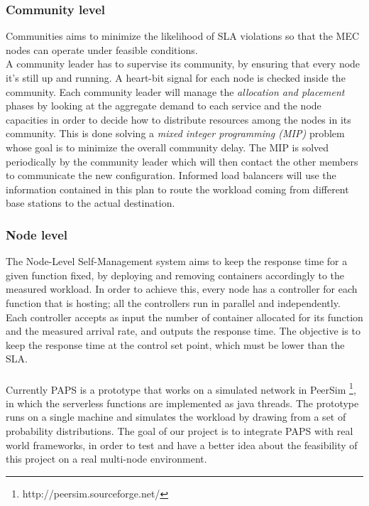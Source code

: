\begin{figure}[h]
    \centering
    \label{fig:pseudocode}
    \label{fig:communities}
\end{figure}

\subsubsection*{Community level}
Communities aims to minimize the likelihood of SLA violations so that the MEC nodes
can operate under feasible conditions.\\
A community leader has to supervise its community, by ensuring that every node it's still up and running.
A heart-bit signal for each node is checked inside the community.
Each community leader will manage the \textit{allocation and placement} phases by looking at 
the aggregate demand to each service and the node capacities in order to decide how to 
distribute resources among the nodes in its community. This is done solving a \textit{mixed
integer programming (MIP)} problem whose goal is to minimize the overall community delay. 
The MIP is solved periodically by the community leader which will then contact the other members
to communicate the new configuration.
Informed load balancers will use the information contained in this plan to route the workload 
coming from different base stations to the actual destination.

\subsubsection*{Node level}
The Node-Level Self-Management system aims to keep the response time for a given function fixed, 
by deploying and removing containers accordingly to the measured workload.
In order to achieve this, every node has a controller for each function that is hosting; all the controllers
run in parallel and independently.
Each controller accepts as input the number of container allocated for its function and the 
measured arrival rate, and outputs the response time. The objective is to keep the response time
at the control set point, which must be lower than the SLA.
\\
\\
Currently PAPS is a prototype that works on a simulated network in PeerSim \footnote{ http://peersim.sourceforge.net/},
in which the serverless functions are implemented as java threads. The prototype runs on a single machine and simulates
the workload by drawing from a set of probability distributions.
The goal of our project is to integrate PAPS with real world frameworks, in order to test and have a better
idea about the feasibility of this project on a real multi-node environment.
